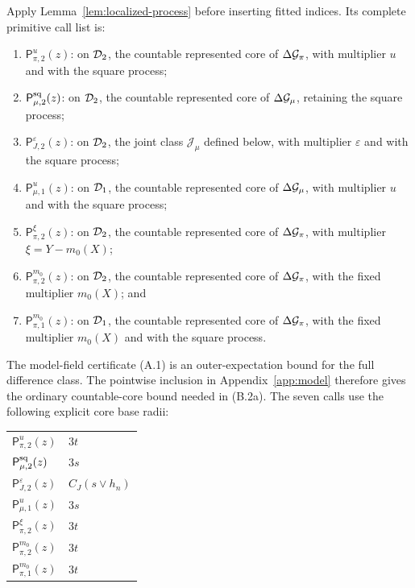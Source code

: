 Apply Lemma~\ref{lem:localized-process} before inserting fitted indices.  Its
complete primitive call list is:
\begin{enumerate}
\item \(\mathsf P_{\pi,2}^{u}(z)\): on \(\mathcal D_2\), the countable
represented core of \(\Delta\mathcal G_\pi\), with multiplier \(u\) and with the
square process;
\item \(\mathsf P_{\mu,2}^{\rm sq}(z)\): on \(\mathcal D_2\), the countable
represented core of \(\Delta\mathcal G_\mu\), retaining the square process;
\item \(\mathsf P_{J,2}^{\varepsilon}(z)\): on \(\mathcal D_2\), the joint
class \(\mathcal J_\mu\) defined below, with multiplier \(\varepsilon\)
and with the square process;
\item \(\mathsf P_{\mu,1}^{u}(z)\): on \(\mathcal D_1\), the countable
represented core of \(\Delta\mathcal G_\mu\), with multiplier \(u\) and with the
square process;
\item \(\mathsf P_{\pi,2}^{\xi}(z)\): on \(\mathcal D_2\), the countable
represented core of \(\Delta\mathcal G_\pi\), with multiplier
\(\xi=Y-m_0(X)\);
\item \(\mathsf P_{\pi,2}^{m_0}(z)\): on \(\mathcal D_2\), the countable
represented core of \(\Delta\mathcal G_\pi\), with the fixed multiplier
\(m_0(X)\); and
\item \(\mathsf P_{\pi,1}^{m_0}(z)\): on \(\mathcal D_1\), the countable
represented core of \(\Delta\mathcal G_\pi\), with the fixed multiplier
\(m_0(X)\) and with the square process.
\end{enumerate}
The model-field certificate (A.1) is an outer-expectation bound for the full
difference class.  The pointwise inclusion in Appendix~\ref{app:model}
therefore gives the ordinary countable-core bound needed in (B.2a).  The
seven calls use the following explicit core base radii:
\begin{center}
\begin{tabular}{ll}
\(\mathsf P_{\pi,2}^{u}(z)\) & \(3t\) \\
\(\mathsf P_{\mu,2}^{\rm sq}(z)\) & \(3s\) \\
\(\mathsf P_{J,2}^{\varepsilon}(z)\) & \(C_J(s\vee h_n)\) \\
\(\mathsf P_{\mu,1}^{u}(z)\) & \(3s\) \\
\(\mathsf P_{\pi,2}^{\xi}(z)\) & \(3t\) \\
\(\mathsf P_{\pi,2}^{m_0}(z)\) & \(3t\) \\
\(\mathsf P_{\pi,1}^{m_0}(z)\) & \(3t\) \\
\end{tabular}
\end{center}
